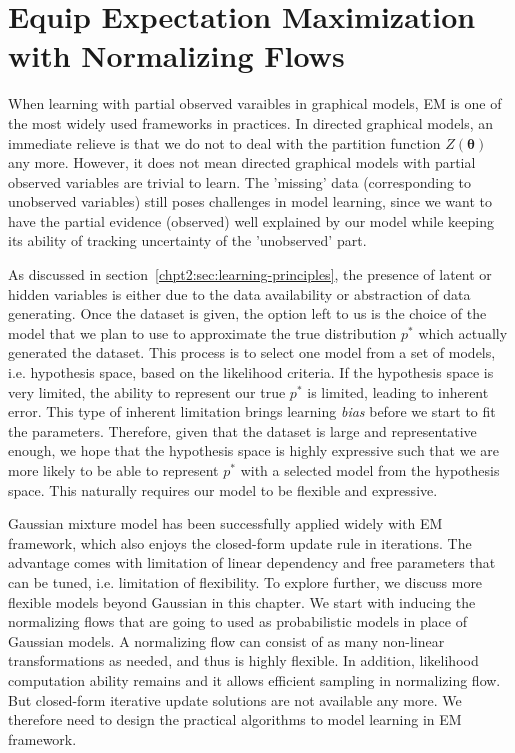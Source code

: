 \chapter{Equip Expectation Maximization with Normalizing Flows}
\label{chpt6:em-flow}
\graphicspath{{source/chapter6/}}

When learning with partial observed varaibles in graphical models, EM is one of the most widely used frameworks in practices. In directed graphical models, an immediate relieve is that we do not to deal with the partition function $Z(\bm{\theta})$ any more. However, it does not mean directed graphical models with partial observed variables are trivial to learn. The 'missing' data (corresponding to unobserved variables) still poses challenges in model learning, since we want to have the partial evidence (observed) well explained by our model while keeping its ability of tracking uncertainty of the 'unobserved' part.

As discussed in section~\ref{chpt2:sec:learning-principles}, the presence of latent or hidden variables is either due to the data availability or abstraction of data generating. Once the dataset is given, the option left to us is the choice of the model that we plan to use to approximate the true distribution $p^{\ast}$ which actually generated the dataset. This process is to select one model from a set of models, i.e. hypothesis space, based on the likelihood criteria. If the hypothesis space is very limited, the ability to represent our true $p^{\ast}$ is limited, leading to inherent error. This type of inherent limitation brings learning \textit{bias} before we start to fit the parameters.
Therefore, given that the dataset is large and representative enough, we hope that the hypothesis space is highly expressive such that we are more likely to be able to represent $p^{\ast}$ with a selected model from the hypothesis space. This naturally requires our model to be flexible and expressive.

Gaussian mixture model has been successfully applied widely with EM framework, which also enjoys the closed-form update rule in iterations. The advantage comes with limitation of linear dependency and free parameters that can be tuned, i.e. limitation of flexibility. To explore further, we discuss more flexible models beyond Gaussian in this chapter. We start with inducing the normalizing flows that are going to used as probabilistic models in place of Gaussian models. A normalizing flow can consist of as many non-linear transformations as needed, and thus is highly flexible. In addition, likelihood computation ability remains and it allows efficient sampling in normalizing flow. But closed-form iterative update solutions are not available any more. We therefore need to design the practical algorithms to model learning in EM framework. 



